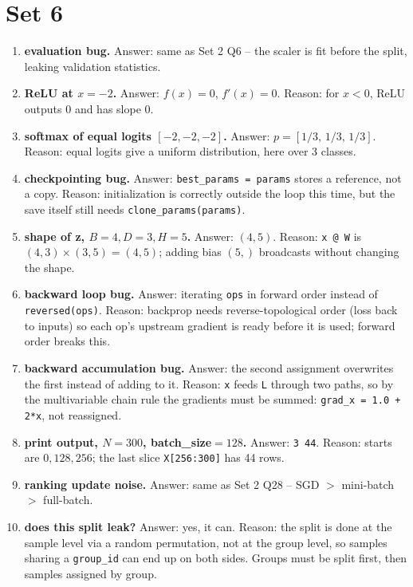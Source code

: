 \documentclass[11pt]{article}
\begin{document}
\section*{Set 6}
\begin{enumerate}

\item \textbf{evaluation bug.}
Answer: same as Set 2 Q6 -- the scaler is fit before the split, leaking
validation statistics.

\item \textbf{ReLU at $x=-2$.}
Answer: $f(x)=0$, $f'(x)=0$.
Reason: for $x<0$, ReLU outputs $0$ and has slope $0$.

\item \textbf{softmax of equal logits $[-2,-2,-2]$.}
Answer: $p=[1/3,\,1/3,\,1/3]$.
Reason: equal logits give a uniform distribution, here over 3 classes.

\item \textbf{checkpointing bug.}
Answer: \texttt{best\_params = params} stores a reference, not a copy.
Reason: initialization is correctly outside the loop this time, but the
save itself still needs \texttt{clone\_params(params)}.

\item \textbf{shape of z, $B=4,D=3,H=5$.}
Answer: $(4,5)$.
Reason: \texttt{x @ W} is $(4,3)\times(3,5)=(4,5)$; adding bias $(5,)$
broadcasts without changing the shape.

\item \textbf{backward loop bug.}
Answer: iterating \texttt{ops} in forward order instead of
\texttt{reversed(ops)}.
Reason: backprop needs reverse-topological order (loss back to inputs) so
each op's upstream gradient is ready before it is used; forward order
breaks this.

\item \textbf{backward accumulation bug.}
Answer: the second assignment overwrites the first instead of adding to
it.
Reason: \texttt{x} feeds \texttt{L} through two paths, so by the
multivariable chain rule the gradients must be summed:
\texttt{grad\_x = 1.0 + 2*x}, not reassigned.

\item \textbf{print output, $N=300$, batch\_size$=128$.}
Answer: \texttt{3 44}.
Reason: starts are $0,128,256$; the last slice \texttt{X[256:300]} has 44
rows.

\item \textbf{ranking update noise.}
Answer: same as Set 2 Q28 -- SGD $>$ mini-batch $>$ full-batch.

\item \textbf{does this split leak?}
Answer: yes, it can.
Reason: the split is done at the sample level via a random permutation,
not at the group level, so samples sharing a \texttt{group\_id} can end up
on both sides. Groups must be split first, then samples assigned by group.

\end{enumerate}
\end{document}

